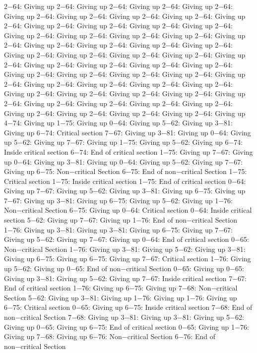 2−64: Giving up
2−64: Giving up
2−64: Giving up
2−64: Giving up
2−64: Giving up
2−64: Giving up
2−64: Giving up
2−64: Giving up
2−64: Giving up
2−64: Giving up
2−64: Giving up
2−64: Giving up
2−64: Giving up
2−64: Giving up
2−64: Giving up
2−64: Giving up
2−64: Giving up
2−64: Giving up
2−64: Giving up
2−64: Giving up
2−64: Giving up
2−64: Giving up
2−64: Giving up
2−64: Giving up
2−64: Giving up
2−64: Giving up
2−64: Giving up
2−64: Giving up
2−64: Giving up
2−64: Giving up
2−64: Giving up
2−64: Giving up
2−64: Giving up
2−64: Giving up
2−64: Giving up
2−64: Giving up
2−64: Giving up
2−64: Giving up
2−64: Giving up
2−64: Giving up
2−64: Giving up
2−64: Giving up
2−64: Giving up
2−64: Giving up
2−64: Giving up
2−64: Giving up
2−64: Giving up
2−64: Giving up
2−64: Giving up
2−64: Giving up
2−64: Giving up
2−64: Giving up
2−64: Giving up
2−64: Giving up
4−74: Giving up
1−75: Giving up
0−64: Giving up
5−62: Giving up
3−81: Giving up
6−74: Critical section
7−67: Giving up
3−81: Giving up
0−64: Giving up
5−62: Giving up
7−67: Giving up
1−75: Giving up
5−62: Giving up
6−74: Inside critical section
6−74: End of critical section
1−75: Giving up
7−67: Giving up
0−64: Giving up
3−81: Giving up
0−64: Giving up
5−62: Giving up
7−67: Giving up
6−75: Non−critical Section
6−75: End of non−critical Section
1−75: Critical section
1−75: Inside critical section
1−75: End of critical section
0−64: Giving up
7−67: Giving up
5−62: Giving up
3−81: Giving up
6−75: Giving up
7−67: Giving up
3−81: Giving up
6−75: Giving up
5−62: Giving up
1−76: Non−critical Section
6−75: Giving up
0−64: Critical section
0−64: Inside critical section
5−62: Giving up
7−67: Giving up
1−76: End of non−critical Section
1−76: Giving up
3−81: Giving up
3−81: Giving up
6−75: Giving up
7−67: Giving up
5−62: Giving up
7−67: Giving up
0−64: End of critical section
0−65: Non−critical Section
1−76: Giving up
3−81: Giving up
5−62: Giving up
3−81: Giving up
6−75: Giving up
6−75: Giving up
7−67: Critical section
1−76: Giving up
5−62: Giving up
0−65: End of non−critical Section
0−65: Giving up
0−65: Giving up
3−81: Giving up
5−62: Giving up
7−67: Inside critical section
7−67: End of critical section
1−76: Giving up
6−75: Giving up
7−68: Non−critical Section
5−62: Giving up
3−81: Giving up
1−76: Giving up
1−76: Giving up
6−75: Critical section
0−65: Giving up
6−75: Inside critical section
7−68: End of non−critical Section
7−68: Giving up
3−81: Giving up
3−81: Giving up
5−62: Giving up
0−65: Giving up
6−75: End of critical section
0−65: Giving up
1−76: Giving up
7−68: Giving up
6−76: Non−critical Section
6−76: End of non−critical Section
